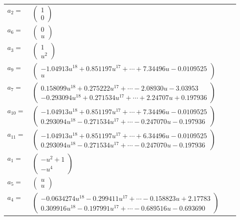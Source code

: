 \documentclass[1p]{elsarticle_modified}
\theoremstyle{definition}
\begin{document}
\begin{tabular}{m{7pt} m{180pt} m{7pt} m{180pt} }
\flushright $a_{2}=$&$\begin{pmatrix}1\\0\end{pmatrix}$ \\
\flushright $a_{6}=$&$\begin{pmatrix}0\\u\end{pmatrix}$ \\
\flushright $a_{3}=$&$\begin{pmatrix}1\\u^2\end{pmatrix}$ \\
\flushright $a_{9}=$&$\begin{pmatrix}-1.04913 u^{18}+0.851197 u^{17}+\cdots+7.34496 u-0.0109525\\u\end{pmatrix}$ \\
\flushright $a_{7}=$&$\begin{pmatrix}0.158099 u^{18}+0.275222 u^{17}+\cdots-2.08930 u-3.03953\\-0.293094 u^{18}+0.271534 u^{17}+\cdots+2.24707 u+0.197936\end{pmatrix}$ \\
\flushright $a_{10}=$&$\begin{pmatrix}-1.04913 u^{18}+0.851197 u^{17}+\cdots+7.34496 u-0.0109525\\0.293094 u^{18}-0.271534 u^{17}+\cdots-0.247070 u-0.197936\end{pmatrix}$ \\
\flushright $a_{11}=$&$\begin{pmatrix}-1.04913 u^{18}+0.851197 u^{17}+\cdots+6.34496 u-0.0109525\\0.293094 u^{18}-0.271534 u^{17}+\cdots-0.247070 u-0.197936\end{pmatrix}$ \\
\flushright $a_{1}=$&$\begin{pmatrix}- u^2+1\\- u^4\end{pmatrix}$ \\
\flushright $a_{5}=$&$\begin{pmatrix}u\\u\end{pmatrix}$ \\
\flushright $a_{4}=$&$\begin{pmatrix}-0.0634274 u^{18}-0.299411 u^{17}+\cdots-0.158823 u+2.17783\\0.309916 u^{18}-0.197991 u^{17}+\cdots-0.689516 u-0.693690\end{pmatrix}$ \\

\end{tabular}
\end{document}
